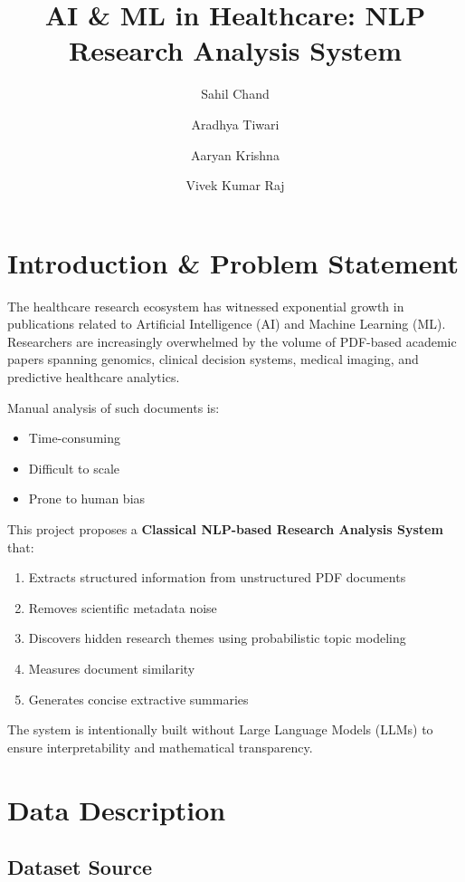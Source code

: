 \documentclass[12pt]{article}
\title{\textbf{AI \& ML in Healthcare: NLP Research Analysis System}}
\author{Sahil Chand \and Aradhya Tiwari \and Aaryan Krishna \and Vivek Kumar Raj}
\date{}
\begin{document}
\maketitle
\tableofcontents
\newpage

\section{Introduction \& Problem Statement}

The healthcare research ecosystem has witnessed exponential growth in publications related to Artificial Intelligence (AI) and Machine Learning (ML). Researchers are increasingly overwhelmed by the volume of PDF-based academic papers spanning genomics, clinical decision systems, medical imaging, and predictive healthcare analytics.

Manual analysis of such documents is:
\begin{itemize}
    \item Time-consuming
    \item Difficult to scale
    \item Prone to human bias
\end{itemize}

This project proposes a \textbf{Classical NLP-based Research Analysis System} that:
\begin{enumerate}
    \item Extracts structured information from unstructured PDF documents
    \item Removes scientific metadata noise
    \item Discovers hidden research themes using probabilistic topic modeling
    \item Measures document similarity
    \item Generates concise extractive summaries
\end{enumerate}

The system is intentionally built without Large Language Models (LLMs) to ensure interpretability and mathematical transparency.

\section{Data Description}

\subsection{Dataset Source}
\end{document}
